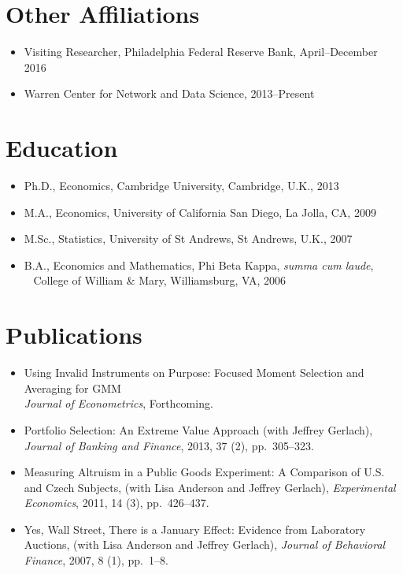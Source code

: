\documentclass[line,overlapped]{myres}
\begin{document}
\begin{resume}
\section{\sc Other Affiliations}
\begin{itemize}
\item Visiting Researcher, Philadelphia Federal Reserve Bank, April--December 2016
\item Warren Center for Network and Data Science, 2013--Present
\end{itemize}

\section{\sc Education}
\begin{itemize}
\item Ph.D., Economics, Cambridge University, Cambridge, U.K., 2013
\item M.A., Economics, University of California San Diego, La Jolla, CA, 2009
\item M.Sc., Statistics, University of St Andrews, St Andrews, U.K., 2007
\item B.A., Economics and Mathematics, Phi Beta Kappa, \emph{summa cum laude},\\ 
  \-\ \hspace{1em} College of William \& Mary, Williamsburg, VA, 2006
\end{itemize}




\section{\sc Publications}
\begin{itemize}
  \item Using Invalid Instruments on Purpose: Focused Moment Selection and Averaging for GMM\\ \emph{Journal of Econometrics}, Forthcoming.
	\item Portfolio Selection: An Extreme Value Approach (with Jeffrey Gerlach), \emph{Journal of Banking and Finance}, 2013, 37 (2), pp.\ 305--323.
	\item Measuring Altruism in a Public Goods Experiment:  A Comparison of U.S. and Czech Subjects, (with Lisa Anderson and Jeffrey Gerlach), \emph{Experimental Economics}, 2011, 14 (3), pp.\ 426--437.
	\item Yes, Wall Street, There is a January Effect: Evidence from Laboratory Auctions, (with Lisa Anderson and Jeffrey Gerlach), \emph{Journal of Behavioral Finance}, 2007, 8 (1), pp.\ 1--8. 
\end{itemize}



\end{resume}
\end{document}

